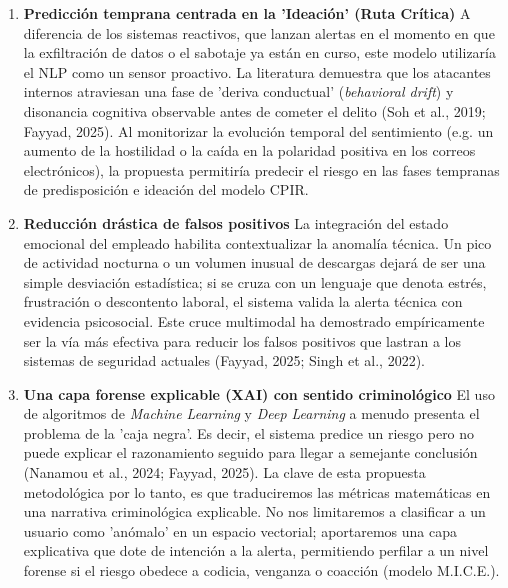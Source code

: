 \documentclass[IB]{TFUOC}%
\begin{document}
\begin{enumerate}
    \item \textbf{Predicción temprana centrada en la 'Ideación' (Ruta Crítica)}\newline
    A diferencia de los sistemas reactivos, que lanzan alertas en el momento en que la exfiltración de datos o el sabotaje ya están en curso, este modelo utilizaría el NLP como un sensor proactivo. La literatura demuestra que los atacantes internos atraviesan una fase de 'deriva conductual' (\textit{behavioral drift}) y disonancia cognitiva observable antes de cometer el delito (Soh et al., 2019; Fayyad, 2025). Al monitorizar la evolución temporal del sentimiento (e.g. un aumento de la hostilidad o la caída en la polaridad positiva en los correos electrónicos), la propuesta permitiría predecir el riesgo en las fases tempranas de predisposición e ideación del modelo CPIR.

    \item \textbf{Reducción drástica de falsos positivos}\newline
    La integración del estado emocional del empleado habilita contextualizar la anomalía técnica. Un pico de actividad nocturna o un volumen inusual de descargas dejará de ser una simple desviación estadística; si se cruza con un lenguaje que denota estrés, frustración o descontento laboral, el sistema valida la alerta técnica con evidencia psicosocial. Este cruce multimodal ha demostrado empíricamente ser la vía más efectiva para reducir los falsos positivos que lastran a los sistemas de seguridad actuales (Fayyad, 2025; Singh et al., 2022).

    \item \textbf{Una capa forense explicable (XAI) con sentido criminológico}\newline
    El uso de algoritmos de \textit{Machine Learning} y \textit{Deep Learning} a menudo presenta el problema de la 'caja negra'. Es decir, el sistema predice un riesgo pero no puede explicar el razonamiento seguido para llegar a semejante conclusión (Nanamou et al., 2024; Fayyad, 2025). La clave de esta propuesta metodológica por lo tanto, es que traduciremos las métricas matemáticas en una narrativa criminológica explicable. No nos limitaremos a clasificar a un usuario como 'anómalo' en un espacio vectorial; aportaremos una capa explicativa que dote de intención a la alerta, permitiendo perfilar a un nivel forense si el riesgo obedece a codicia, venganza o coacción (modelo M.I.C.E.).

\end{enumerate}
\end{document}
